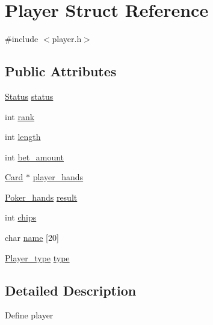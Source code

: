 \hypertarget{structPlayer}{\section{Player Struct Reference}
\label{structPlayer}
}


{\ttfamily \#include $<$player.\+h$>$}

\subsection*{Public Attributes}
\begin{DoxyCompactItemize}
\item 
\hyperlink{player_8h_ad56becc6de6903936d4070a4216142dc}{Status} \hyperlink{structPlayer_aeb08943a32834515e66222d2e948292d}{status}
\item 
int \hyperlink{structPlayer_a307c222c67b1318ec1d7dc9095c50a98}{rank}
\item 
int \hyperlink{structPlayer_a8f9727475d39a22eec59dd3905357e9e}{length}
\item 
int \hyperlink{structPlayer_a37afeb42d31865a99f75c357f46dad88}{bet\+\_\+amount}
\item 
\hyperlink{structCard}{Card} $\ast$ \hyperlink{structPlayer_a01bb1b5125e4aad0e98d16c7d68b059e}{player\+\_\+hands}
\item 
\hyperlink{structPoker__hands}{Poker\+\_\+hands} \hyperlink{structPlayer_a6c2e05abd5b83faf72239511f992af36}{result}
\item 
int \hyperlink{structPlayer_a29614b447e37b1c5da87d0f2f75441d5}{chips}
\item 
char \hyperlink{structPlayer_ab71c17a9d17662887a1ecd0b32fe8812}{name} \mbox{[}20\mbox{]}
\item 
\hyperlink{player_8h_a18f0f8cbac879377978628626293120d}{Player\+\_\+type} \hyperlink{structPlayer_a89a4fdb70177957727ae3816b962ca2f}{type}
\end{DoxyCompactItemize}


\subsection{Detailed Description}
Define player 


